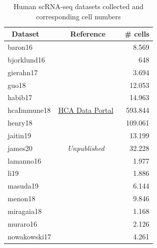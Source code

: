 \begin{table}[ht!] %
\normalsize
\caption[Human scRNA-seq datasets collected and corresponding cell numbers]{Human scRNA-seq datasets collected and corresponding cell numbers}
\centering
\label{table:tab_humancells}

\begin{tabular}{l|c|r}
\toprule
~\textbf{Dataset} & ~\textbf{Reference} & ~\textbf{\# cells} \\
\midrule
baron16 & ~\citep{baron_single-cell_2016} & 8.569  \\

bjorklund16 & ~\citep{bjorklund_heterogeneity_2016} & 648  \\

gierahn17 & ~\citep{gierahn_seq-well:_2017} & 3.694  \\

guo18 & ~\citep{guo_adult_2018} & 12.053  \\

habib17 & ~\citep{habib_massively_2017} & 14.963  \\

hcaImmune18 & \href{data.humancellatlas.org}{HCA Data Portal} & 593.844  \\

henry18 & ~\citep{henry_cellular_2018} & 109.061  \\

jaitin19 & ~\citep{jaitin_lipid-associated_2019} & 13.199  \\

james20 & \textit{Unpublished} & 32.228  \\

lamanno16 & ~\citep{la_manno_molecular_2016} & 1.977  \\

li19 & ~\citep{li_memory_2019} & 1.886  \\

masuda19 & ~\citep{masuda_spatial_2019} & 6.144  \\

menon18 & ~\citep{menon_single-cell_2018} & 9.846  \\

miragaia18 & ~\citep{miragaia_single-cell_2019} & 1.168  \\

muraro16 & ~\citep{muraro_single-cell_2016} & 2.126  \\

nowakowski17 & ~\citep{nowakowski_spatiotemporal_2017} & 4.261  \\


\end{tabular}
\end{table}
